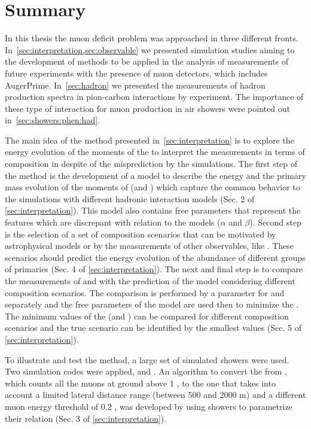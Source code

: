\chapter[Summary]{Summary}
\label{sec:conclusions}

In this thesis the muon deficit problem was approached in three different fronts.
In~\cref{sec:interpretation,sec:observable} we presented simulation studies aiming
to the development of methods to be applied in the analysis of measurements of
future experiments with the presence of muon detectors, which includes AugerPrime.
In~\cref{sec:hadron} we presented the measurements of hadron production spectra
in pion-carbon interactions by \NASixtyOne experiment. The importance of these type
of interaction for muon production in air showers were pointed
out in~\cref{sec:showers:phen:had}. \newline

The main idea of the method presented in~\cref{sec:interpretation}
is to explore the energy evolution of the moments of the \nmu
to interpret the measurements in terms of composition in despite
of the \nmu misprediction by the simulations. The first step of the method
is the development of a model to describe the energy and the primary mass evolution
of the moments of \lgnmu (\lgnmumean and \lgnmurms)
which capture the common behavior to the simulations with different
hadronic interaction models (Sec. 2 of \cref{sec:interpretation}).
This model also contains free parameters that represent
the features which are discrepant with relation to the models ($\alpha$ and $\beta$).
Second step is the selection of a set of composition scenarios that can be
motivated by astrophysical models or by the measurements of other observables, like \xmax.
These scenarios should predict the energy evolution of the abundance of different
groups of primaries (Sec. 4 of \cref{sec:interpretation}).
The next and final step is to compare the measurements of \lgnmumean and \lgnmurms
with the prediction of the model considering different composition scenarios. The comparison
is performed by a \cchi parameter for \lgnmumean and \lgnmurms separately and the free parameters of the model
are used then to minimize the \cchi. The minimum values of the \cchi (\chiminalpha and \chiminbeta)
can be compared for different composition scenarios and the true scenario can be identified by the smallest
values (Sec. 5 of \cref{sec:interpretation}).

To illustrate and test the method, a large set of simulated showers were used.
Two simulation codes were applied, \Conex and \Corsika. An algorithm to convert
the \nmu from \Conex, which counts all the muons at ground above 1 \GeV, to the
one that takes into account a limited lateral distance range (between 500 and 2000 m)
and a different muon energy threshold of 0.2 \GeV,
was developed by using \Corsika showers to parametrize their relation
(Sec. 3 of \cref{sec:interpretation}).

